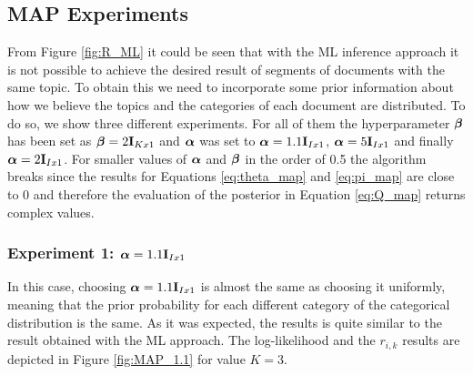 \documentclass[12pt]{article}
\begin{document}
\subsection{MAP Experiments}

From Figure \ref{fig:R_ML} it could be seen that with the ML inference approach it is not possible to achieve the desired result of segments of documents with the same topic. To obtain this we need to incorporate some prior information about how we believe the topics and the categories of each document are distributed. To do so, we show three different experiments. For all of them the hyperparameter $\boldsymbol\beta$ has been set as $\boldsymbol\beta = 2\mathbf{I}_{Kx1}$ and $\boldsymbol\alpha$ was set to 
$\boldsymbol\alpha = 1.1\mathbf{I}_{Ix1}$, $\boldsymbol\alpha = 5\mathbf{I}_{Ix1}$ and finally $\boldsymbol\alpha = 2\mathbf{I}_{Ix1}$. For smaller values of $\boldsymbol\alpha$ and $\boldsymbol\beta$ in the order of 0.5 the algorithm breaks since the results for Equations \ref{eq:theta_map} and \ref{eq:pi_map} are close to 0 and therefore the evaluation of the posterior in Equation \ref{eq:Q_map} returns complex values.

\subsubsection{Experiment 1: $\boldsymbol\alpha = 1.1\mathbf{I}_{Ix1}$} 

In this case, choosing $\boldsymbol\alpha = 1.1\mathbf{I}_{Ix1}$ is almost the same as choosing it uniformly, meaning that the prior probability for each different category of the categorical distribution is the same. As it was expected, the results is quite similar to the result obtained with the ML approach. The log-likelihood and the $r_{i,k}$ results are depicted in Figure \ref{fig:MAP_1.1} for value $K=3$.
\end{document}

